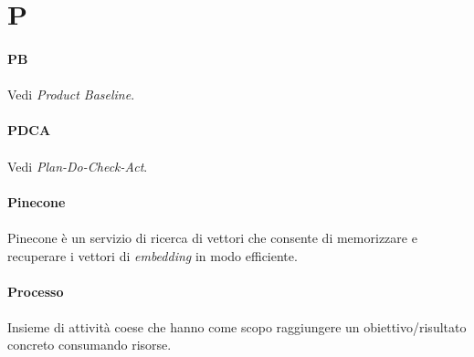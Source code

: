 \documentclass[10pt, a4paper]{article}
\begin{document}
\newpage
\section{P}




\vspace{2em}
\paragraph{PB}\noindent\hrulefill 
\paragraph{}Vedi \textit{Product Baseline\pg}.

\vspace{2em}
\paragraph{PDCA}\noindent\hrulefill 
\paragraph{}Vedi \textit{Plan-Do-Check-Act\pg}.


\vspace{2em}
\paragraph{Pinecone}\noindent\hrulefill
\paragraph{}Pinecone è un servizio di ricerca di vettori che consente di memorizzare e recuperare i vettori di \textit{embedding} in modo efficiente.







\vspace{2em}
\paragraph{Processo}\noindent\hrulefill
\paragraph{}Insieme di attività coese che hanno come scopo raggiungere un obiettivo/risultato concreto consumando risorse.

\vspace{2em}
\end{document}
